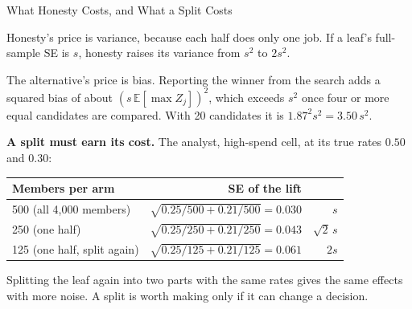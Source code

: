 \documentclass[aspectratio=169, 11pt, handout]{beamer}
\newcommand{\E}{\mathbb{E}}
\begin{document}
\begin{frame}{What Honesty Costs, and What a Split Costs}

Honesty's price is variance, because each half does only one job. If a leaf's full-sample SE is $s$, honesty raises its variance from $s^2$ to $2s^2$.

\smallskip

The alternative's price is bias. Reporting the winner from the search adds a squared bias of about $(s\,\E[\max Z_j])^2$, which exceeds $s^2$ once four or more equal candidates are compared. With 20 candidates it is $1.87^2 s^2 = 3.50\,s^2$.

\bigskip

\textbf{A split must earn its cost.} The analyst, high-spend cell, at its true rates $0.50$ and $0.30$:

\begin{center}
\small
\begin{tabular}{lrr}
\toprule
\textbf{Members per arm} & \textbf{SE of the lift} & \\
\midrule
500 (all 4{,}000 members) & $\sqrt{0.25/500 + 0.21/500} = 0.030$ & $s$ \\
250 (one half) & $\sqrt{0.25/250 + 0.21/250} = 0.043$ & $\sqrt2\, s$ \\
125 (one half, split again) & $\sqrt{0.25/125 + 0.21/125} = 0.061$ & $2s$ \\
\bottomrule
\end{tabular}
\end{center}

\smallskip

Splitting the leaf again into two parts with the same rates gives the same effects with more noise. A split is worth making only if it can change a decision.
\end{frame}
\end{document}
